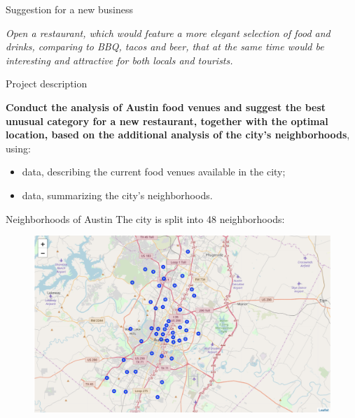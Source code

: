 \documentclass{beamer}
\begin{document}
  \begin{frame}{Suggestion for a new business}
  \begin{center}
{\it Open a restaurant, which would feature a more
elegant selection of food and drinks, comparing to BBQ, tacos and beer, that at the same time would be
interesting and attractive for both locals and tourists.}
\end{center}
    \end{frame}
     \begin{frame}{Project description}
  \begin{center}
{\bf Conduct the analysis of Austin food venues and suggest
the best unusual category for a new restaurant, together with the optimal location, based
on the additional analysis of the city's neighborhoods}, using:
\end{center}
\begin{itemize}
\item[\EightStarTaper] data, describing the current food venues available in the city;
\item[\EightStarTaper] data, summarizing the city's neighborhoods.
\end{itemize}
    \end{frame}
% 
    \begin{frame}{Neighborhoods of Austin}
 The city is split into 48 neighborhoods:   
     \begin{figure}[H]
	\centering
	\includegraphics[width=.9\textwidth]{pics/neighborhoods}
\end{figure}
  \end{frame}
\end{document}
